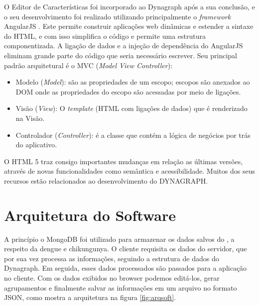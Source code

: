 O Editor de Características foi incorporado ao Dynagraph após a sua conclusão, e o seu desenvolvimento foi realizado utilizando principalmente o \textit{framework} AngularJS \cite{angularjs}.
Este permite construir aplicações web dinâmicas e estender a sintaxe do HTML, e com isso simplifica o código e permite uma estrutura componentizada. A ligação de dados e a injeção de dependência do AngularJS eliminam grande parte do código que seria necessário escrever.
Seu principal padrão arquitetural é o MVC (\textit{Model View Controller}):
\begin{itemize}
	\item Modelo (\textit{Model}): são as propriedades de um escopo; escopos são anexados ao DOM onde as propriedades do escopo são acessadas por meio de ligações.
	\item Visão (\textit{View}): O \textit{template} (HTML com ligações de dados) que é renderizado na Visão.
	\item Controlador (\textit{Controller}): é a classe que contém a lógica de negócios por trás do aplicativo.
\end{itemize}

O HTML 5 traz consigo importantes mudanças em relação as últimas versões, através de novas funcionalidades como semântica e acessibilidade. Muitos dos seus recursos estão relacionados ao desenvolvimento do DYNAGRAPH.


\section{Arquitetura do Software}
A princípio o MongoDB foi utilizado para armazenar os dados salvos do \cite{simda}, a respeito da dengue e chikungunya. O cliente requisita os dados do servidor, que por sua vez processa as informações, seguindo a estrutura de dados do Dynagraph. Em seguida, esses dados processados são passados para a aplicação no cliente. Com os dados exibidos no browser podemos editá-los, gerar agrupamentos e finalmente salvar as informações em um arquivo no formato JSON, como mostra a arquitetura na figura \ref{fig:arqsoft}.

